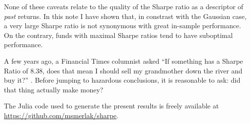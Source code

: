 \documentclass[
reprint,
amsmath,amssymb,
aps,
]{revtex4-2}
\begin{document}
None of these caveats relate to the quality of the Sharpe ratio as a descriptor of \emph{past} returns. 
In this note I have shown that, in constrast with the Gaussian case, a very large Sharpe ratio is not synonymous with great in-sample performance. 
On the contrary, funds with maximal Sharpe ratios tend to have suboptimal performance. 

A few years ago, a Financial Times columnist asked ``If something has a Sharpe Ratio of 8.38, does that mean I should sell my grandmother down the river and buy it?'' \cite{shubberIf2016}. 
Before jumping to hazardous conclusions, it is reasonable to ask: did that thing actually make money? 

\medskip

The Julia code used to generate the present results is freely available at \url{https://github.com/msmerlak/sharpe}. 


\end{document}

